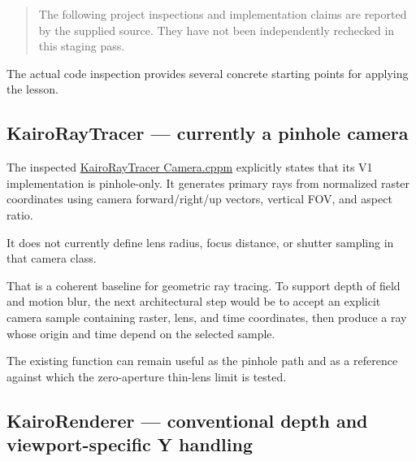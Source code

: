 \hypertarget{02-foundations-ii-ch037-repository-observations-reported-by-the-supplied-source}{}

\begin{quote}
The following project inspections and implementation claims are reported by the supplied source. They have not been independently rechecked in this staging pass.
\end{quote}

The actual code inspection provides several concrete starting points for applying the lesson.

\subsection{KairoRayTracer --- currently a pinhole camera}\label{02-foundations-ii-ch037-kairoraytracer-currently-a-pinhole-camera}

\hypertarget{02-foundations-ii-ch037-kairoraytracer-currently-a-pinhole-camera}{}

The inspected \href{https://github.com/swayam8624/KairoRayTracer/blob/main/Camera.cppm?utm_source=chatgpt.com}{KairoRayTracer Camera.cppm} explicitly states that its V1 implementation is pinhole-only. It generates primary rays from normalized raster coordinates using camera forward/right/up vectors, vertical FOV, and aspect ratio.

It does not currently define lens radius, focus distance, or shutter sampling in that camera class.

That is a coherent baseline for geometric ray tracing. To support depth of field and motion blur, the next architectural step would be to accept an explicit camera sample containing raster, lens, and time coordinates, then produce a ray whose origin and time depend on the selected sample.

The existing  function can remain useful as the pinhole path and as a reference against which the zero-aperture thin-lens limit is tested.

\subsection{KairoRenderer --- conventional depth and viewport-specific Y handling}\label{02-foundations-ii-ch037-kairorenderer-conventional-depth-and-viewport-specific-y-handling}

\hypertarget{02-foundations-ii-ch037-kairorenderer-conventional-depth-and-viewport-specific-y-handling}{}

